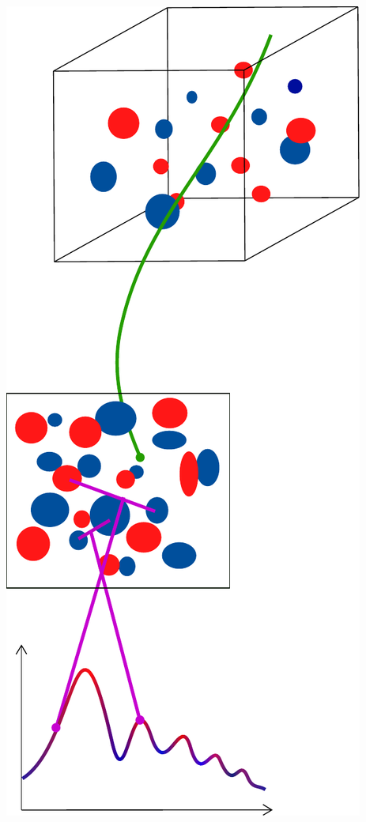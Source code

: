 \begin{frame}[fragile]
\begin{columns}[T]
\begin{column}{0.4\textwidth}
		\includegraphics[height=0.75\textheight]{Figures/projection}
	\end{column}
	\end{columns}
\end{frame}

